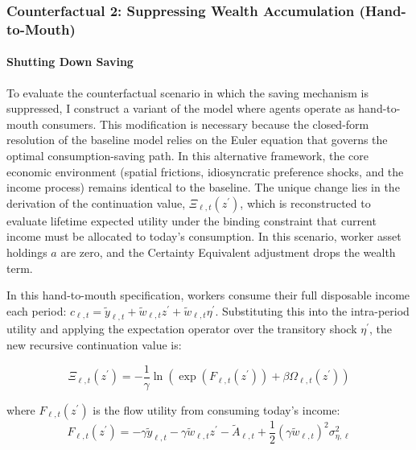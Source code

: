 \documentclass[12pt, a4paper]{article}
\begin{document}


\subsubsection*{\large Counterfactual 2: Suppressing Wealth Accumulation (Hand-to-Mouth)}
\paragraph{Shutting Down Saving} To evaluate the counterfactual scenario in which the saving mechanism is suppressed, I construct a variant of the model where agents operate as hand-to-mouth consumers. This modification is necessary because the closed-form resolution of the baseline model relies on the Euler equation that governs the optimal consumption-saving path. In this alternative framework, the core economic environment (spatial frictions, idiosyncratic preference shocks, and the income process) remains identical to the baseline. The unique change lies in the derivation of the continuation value, $\Xi_{\ell,t}(z^\prime)$, which is reconstructed to evaluate lifetime expected utility under the binding constraint that current income must be allocated to today's consumption. In this scenario, worker asset holdings $a$ are zero, and the Certainty Equivalent adjustment drops the wealth term.

In this hand-to-mouth specification, workers consume their full disposable income each period: $c_{\ell,t} = \tilde{y}_{\ell,t} + \tilde{w}_{\ell,t}z^\prime + \tilde{w}_{\ell,t}\eta^\prime$. Substituting this into the intra-period utility and applying the expectation operator over the transitory shock $\eta^\prime$, the new recursive continuation value is:

\begin{equation}
\Xi_{\ell,t}(z^\prime) = -\frac{1}{\gamma} \ln \left( \exp\left(F_{\ell,t}(z^\prime)\right) + \beta \Omega_{\ell,t}(z^\prime) \right)
\label{eq:Xi_nosaving}
\end{equation}

where $F_{\ell,t}(z^\prime)$ is the flow utility from consuming today's income:
\begin{equation}
F_{\ell,t}(z^\prime) = -\gamma \tilde{y}_{\ell,t} - \gamma \tilde{w}_{\ell,t} z^\prime - \tilde{A}_{\ell,t} + \frac{1}{2}(\gamma \tilde{w}_{\ell,t})^2 \sigma_{\eta,\ell}^2
\end{equation}
\end{document}
